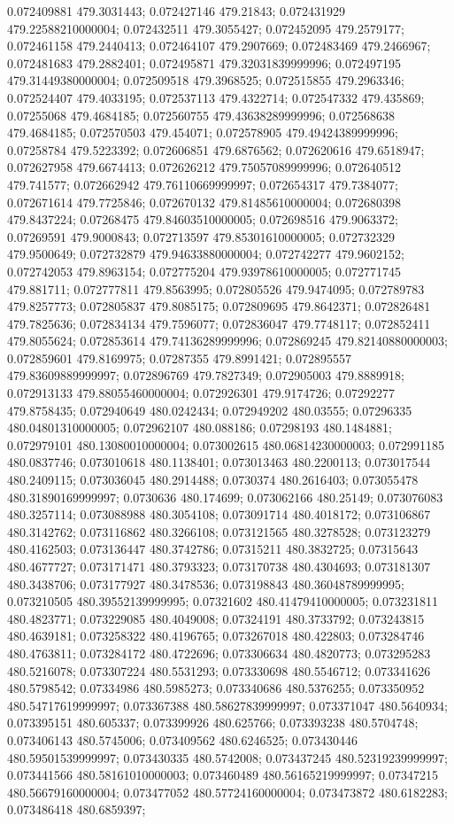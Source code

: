 0.072409881 479.3031443; 0.072427146 479.21843; 0.072431929 479.22588210000004; 0.072432511 479.3055427; 0.072452095 479.2579177; 0.072461158 479.2440413; 0.072464107 479.2907669; 0.072483469 479.2466967; 0.072481683 479.2882401; 0.072495871 479.32031839999996; 0.072497195 479.31449380000004; 0.072509518 479.3968525; 0.072515855 479.2963346; 0.072524407 479.4033195; 0.072537113 479.4322714; 0.072547332 479.435869; 0.07255068 479.4684185; 0.072560755 479.43638289999996; 0.072568638 479.4684185; 0.072570503 479.454071; 0.072578905 479.49424389999996; 0.07258784 479.5223392; 0.072606851 479.6876562; 0.072620616 479.6518947; 0.072627958 479.6674413; 0.072626212 479.75057089999996; 0.072640512 479.741577; 0.072662942 479.76110669999997; 0.072654317 479.7384077; 0.072671614 479.7725846; 0.072670132 479.81485610000004; 0.072680398 479.8437224; 0.07268475 479.84603510000005; 0.072698516 479.9063372; 0.07269591 479.9000843; 0.072713597 479.85301610000005; 0.072732329 479.9500649; 0.072732879 479.94633880000004; 0.072742277 479.9602152; 0.072742053 479.8963154; 0.072775204 479.93978610000005; 0.072771745 479.881711; 0.072777811 479.8563995; 0.072805526 479.9474095; 0.072789783 479.8257773; 0.072805837 479.8085175; 0.072809695 479.8642371; 0.072826481 479.7825636; 0.072834134 479.7596077; 0.072836047 479.7748117; 0.072852411 479.8055624; 0.072853614 479.74136289999996; 0.072869245 479.82140880000003; 0.072859601 479.8169975; 0.07287355 479.8991421; 0.072895557 479.83609889999997; 0.072896769 479.7827349; 0.072905003 479.8889918; 0.072913133 479.88055460000004; 0.072926301 479.9174726; 0.07292277 479.8758435; 0.072940649 480.0242434; 0.072949202 480.03555; 0.07296335 480.04801310000005; 0.072962107 480.088186; 0.07298193 480.1484881; 0.072979101 480.13080010000004; 0.073002615 480.06814230000003; 0.072991185 480.0837746; 0.073010618 480.1138401; 0.073013463 480.2200113; 0.073017544 480.2409115; 0.073036045 480.2914488; 0.0730374 480.2616403; 0.073055478 480.31890169999997; 0.0730636 480.174699; 0.073062166 480.25149; 0.073076083 480.3257114; 0.073088988 480.3054108; 0.073091714 480.4018172; 0.073106867 480.3142762; 0.073116862 480.3266108; 0.073121565 480.3278528; 0.073123279 480.4162503; 0.073136447 480.3742786; 0.07315211 480.3832725; 0.07315643 480.4677727; 0.073171471 480.3793323; 0.073170738 480.4304693; 0.073181307 480.3438706; 0.073177927 480.3478536; 0.073198843 480.36048789999995; 0.073210505 480.39552139999995; 0.07321602 480.41479410000005; 0.073231811 480.4823771; 0.073229085 480.4049008; 0.07324191 480.3733792; 0.073243815 480.4639181; 0.073258322 480.4196765; 0.073267018 480.422803; 0.073284746 480.4763811; 0.073284172 480.4722696; 0.073306634 480.4820773; 0.073295283 480.5216078; 0.073307224 480.5531293; 0.073330698 480.5546712; 0.073341626 480.5798542; 0.07334986 480.5985273; 0.073340686 480.5376255; 0.073350952 480.54717619999997; 0.073367388 480.58627839999997; 0.073371047 480.5640934; 0.073395151 480.605337; 0.073399926 480.625766; 0.073393238 480.5704748; 0.073406143 480.5745006; 0.073409562 480.6246525; 0.073430446 480.59501539999997; 0.073430335 480.5742008; 0.073437245 480.52319239999997; 0.073441566 480.58161010000003; 0.073460489 480.56165219999997; 0.07347215 480.56679160000004; 0.073477052 480.57724160000004; 0.073473872 480.6182283; 0.073486418 480.6859397; 